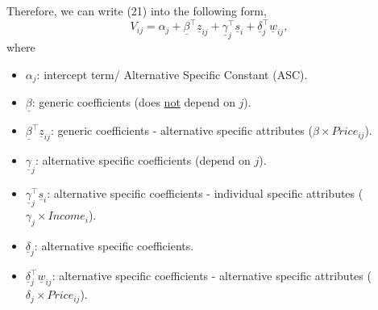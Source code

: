 \documentclass[11pt]{article}
\begin{document}
Therefore, we can write (21) into the following form,
\begin{equation}
V_{ij} = \alpha_j + \underline{\beta}^\intercal \underline{z}_{ij} + \underline{\gamma}_j^\intercal \underline{s}_i + \underline{\delta}_j^\intercal \underline{w}_{ij},
\end{equation}
where
\begin{itemize}
	\item $\alpha_j$: intercept term/ Alternative Specific Constant (ASC).
	\item $\underline{\beta}$: generic coefficients (does \underline{not} depend on $j$).
	\item $\underline{\beta}^\intercal \underline{z}_{ij}$: generic coefficients - alternative specific attributes ($\beta\times Price_{ij}$).
	\item $\underline{\gamma}_j$: alternative specific coefficients (depend on $j$).
	\item $\underline{\gamma}_j^\intercal \underline{s}_i$: alternative specific coefficients - individual specific attributes ($\gamma_j \times Income_i$).
	\item $\underline{\delta}_j$: alternative specific coefficients.
	\item $\underline{\delta}_j^\intercal \underline{w}_{ij}$: alternative specific coefficients - alternative specific attributes ($\delta_j\times Price_{ij}$).
\end{itemize}
\end{document}
